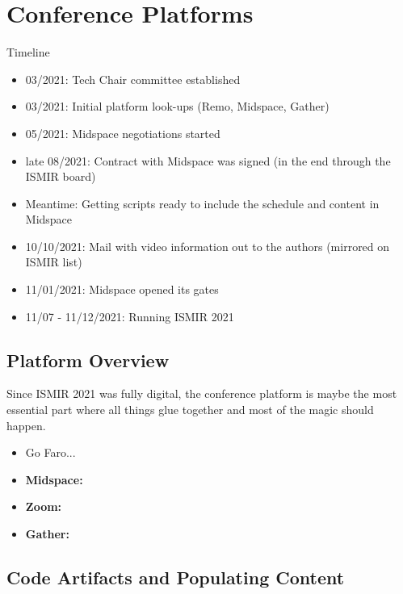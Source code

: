 \documentclass[%
10pt,								%
titlepage,						%
]
{scrartcl}
\begin{document}
\section{Conference Platforms}

Timeline
\begin{itemize}
    \item 03/2021: Tech Chair committee established
    \item 03/2021: Initial platform look-ups (Remo, Midspace, Gather)
    \item 05/2021: Midspace negotiations started
    \item late 08/2021: Contract with Midspace was signed (in the end through the ISMIR board)
    \item Meantime: Getting scripts ready to include the schedule and content in Midspace
    \item 10/10/2021: Mail with video information out to the authors (mirrored on ISMIR list)
    \item 11/01/2021: Midspace opened its gates
    \item 11/07 - 11/12/2021: Running ISMIR 2021
\end{itemize}

\subsection{Platform Overview}

Since ISMIR 2021 was fully digital, the conference platform is maybe the most essential part where all things glue together and most of the magic should happen.

\begin{itemize}
    \item Go Faro...
    \item \textbf{Midspace:}
    \item \textbf{Zoom:}
    \item \textbf{Gather:}
\end{itemize}

\subsection{Code Artifacts and Populating Content}
\end{document}
